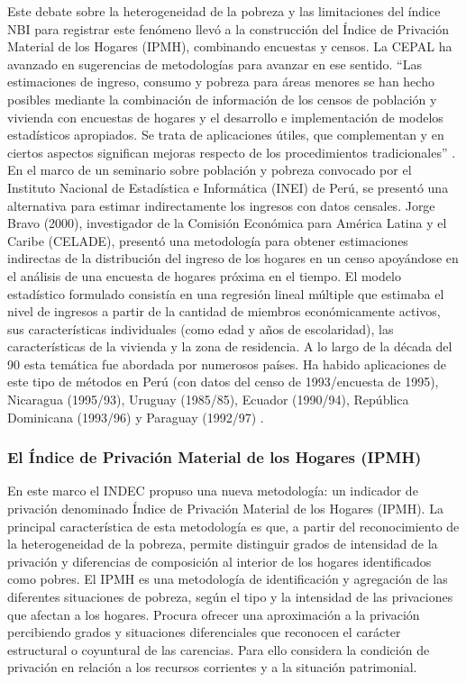 Este debate sobre la heterogeneidad de la pobreza y las limitaciones del índice NBI para registrar este fenómeno llevó a la construcción del Índice de Privación Material de los Hogares (IPMH), combinando encuestas y censos. La CEPAL \cite{bravo2000a,bravo2000b} ha avanzado en sugerencias de metodologías para avanzar en ese sentido. “Las estimaciones de ingreso, consumo y pobreza para áreas menores se han hecho posibles mediante la combinación de información de los censos de población y vivienda con encuestas de hogares y el desarrollo e implementación de modelos estadísticos apropiados. Se trata de aplicaciones útiles, que complementan y en ciertos aspectos significan mejoras respecto de los procedimientos tradicionales” \cite[p.~225]{bravo2000a}. En el marco de un seminario sobre población y pobreza convocado por el Instituto Nacional de Estadística e Informática (INEI) de Perú, se presentó una alternativa para estimar indirectamente los ingresos con datos censales. Jorge Bravo (2000), investigador de la Comisión Económica para América Latina y el Caribe (CELADE), presentó una metodología para obtener estimaciones indirectas de la distribución del ingreso de los hogares en un censo apoyándose en el análisis de una encuesta de hogares próxima en el tiempo. El modelo estadístico formulado consistía en una regresión lineal múltiple que estimaba el nivel de ingresos a partir de la cantidad de miembros económicamente activos, sus características individuales (como edad y años de escolaridad), las características de la vivienda y la zona de residencia. A lo largo de la década del 90 esta temática fue abordada por numerosos países. Ha habido aplicaciones de este tipo de métodos en Perú (con datos del censo de 1993/encuesta de 1995), Nicaragua (1995/93), Uruguay (1985/85), Ecuador (1990/94), República Dominicana (1993/96) y Paraguay (1992/97) \cite{bravo2000a,bravo2000b}.

 \subsubsection{El Índice de Privación Material de los Hogares (IPMH)}

En este marco el INDEC \citeyear{indec2000a,indec2000b,indec2003a,indec2003b,indec2003c,indec2003d} propuso una nueva metodología: un indicador de privación denominado Índice de Privación Material de los Hogares (IPMH). La principal característica de esta metodología es que, a partir del reconocimiento de la heterogeneidad de la pobreza, permite distinguir grados de intensidad de la privación y diferencias de composición al interior de los hogares identificados como pobres. El IPMH es una metodología de identificación y agregación de las diferentes situaciones de pobreza, según el tipo y la intensidad de las privaciones que afectan a los hogares. Procura ofrecer una aproximación a la privación percibiendo grados y situaciones diferenciales que reconocen el carácter estructural o coyuntural de las carencias. Para ello considera la condición de privación en relación a los recursos corrientes y a la situación patrimonial.

